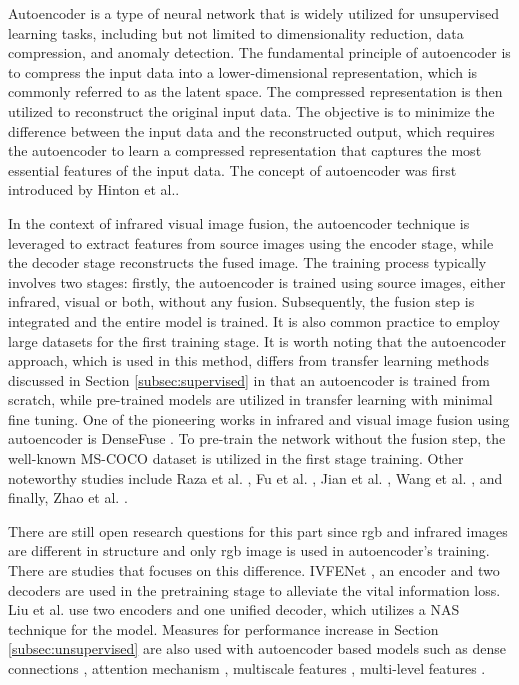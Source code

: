 Autoencoder is a type of neural network that is widely utilized for unsupervised learning tasks, including but not limited to dimensionality reduction, data compression, and anomaly detection. The fundamental principle of autoencoder is to compress the input data into a lower-dimensional representation, which is commonly referred to as the latent space. The compressed representation is then utilized to reconstruct the original input data. The objective is to minimize the difference between the input data and the reconstructed output, which requires the autoencoder to learn a compressed representation that captures the most essential features of the input data. The concept of autoencoder was first introduced by Hinton et al.\cite{hinton2006reducing}.

In the context of infrared visual image fusion, the autoencoder technique is leveraged to extract features from source images using the encoder stage, while the decoder stage reconstructs the fused image. The training process typically involves two stages: firstly, the autoencoder is trained using source images, either infrared, visual or both, without any fusion. Subsequently, the fusion step is integrated and the entire model is trained. It is also common practice to employ large datasets for the first training stage. It is worth noting that the autoencoder approach, which is used in this method, differs from transfer learning methods discussed in Section \ref{subsec:supervised} in that an autoencoder is trained from scratch, while pre-trained models are utilized in transfer learning with minimal fine tuning. One of the pioneering works in infrared and visual image fusion using autoencoder is DenseFuse \cite{li2019infrared}. To pre-train the network without the fusion step, the well-known MS-COCO dataset \cite{lin2014microsoft} is utilized in the first stage training. Other noteworthy studies include Raza et al. \cite{raza2020pfaf}, Fu et al. \cite{fu2021dual}, Jian et al. \cite{jian2020sedrfuse}, Wang et al. \cite{wang2022res2fusion}, and finally, Zhao et al. \cite{zhao2021efficient}.

There are still open research questions for this part since rgb and infrared images are different in structure and only rgb image is used in autoencoder's training. There are studies that focuses on this difference. IVFENet \cite{zhao2021self}, an encoder and two decoders are used in the pretraining stage to alleviate the vital information loss. Liu et al. \cite{liu2021smoa} use two encoders and one unified decoder, which utilizes a NAS technique for the model. Measures for performance increase in Section \ref{subsec:unsupervised} are also used with autoencoder based models such as dense connections \cite{pan2021densenetfuse, wang2021unfusion, li2022infrared}, attention mechanism \cite{wang2021unfusion}, multiscale features \cite{li2019infrared,wang2021unfusion}, multi-level features \cite{peng2022mfdetection}.

